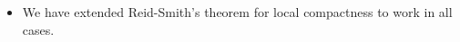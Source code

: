 \documentclass[preview]{standalone}
\begin{document}
\begin{center}
\begin{itemize} \item We have extended Reid-Smith's theorem for local compactness to work in all cases.\end{itemize}
\end{center}
\end{document}
